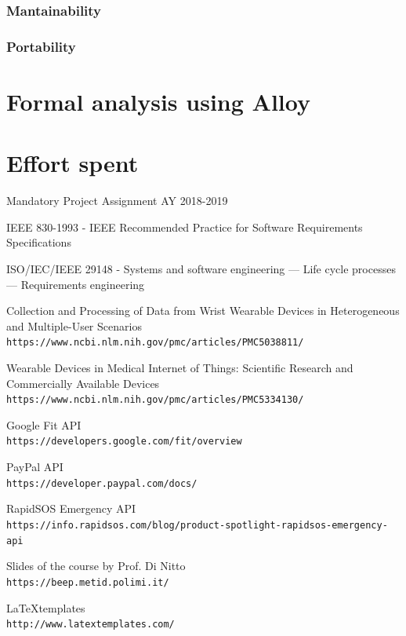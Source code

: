 \documentclass[12pt]{article}
\begin{document}
    \subsubsection{Mantainability}
    \subsubsection{Portability}

\clearpage
\section{Formal analysis using Alloy}
\label{sec:alloy}

\clearpage
\section{Effort spent}
\label{sec:effort}

\clearpage
\begin{thebibliography}{9}
   Mandatory Project Assignment AY 2018-2019

   IEEE 830-1993 - IEEE Recommended Practice for Software Requirements Specifications

   ISO/IEC/IEEE 29148 - Systems and software engineering — Life cycle processes — Requirements engineering

   Collection and Processing of Data from Wrist Wearable Devices in Heterogeneous and Multiple-User Scenarios\\
  \texttt{https://www.ncbi.nlm.nih.gov/pmc/articles/PMC5038811/}

   Wearable Devices in Medical Internet of Things: Scientific Research and Commercially Available Devices\\
  \texttt{https://www.ncbi.nlm.nih.gov/pmc/articles/PMC5334130/}

   Google Fit API\\
  \texttt{https://developers.google.com/fit/overview}

   PayPal API\\
  \texttt{https://developer.paypal.com/docs/}

   RapidSOS Emergency API\\
  \texttt{https://info.rapidsos.com/blog/product-spotlight-rapidsos-emergency-api}

  Slides of the course by Prof. Di Nitto\\
  \texttt{https://beep.metid.polimi.it/}

  \LaTeX templates\\
  \texttt{http://www.latextemplates.com/}


\end{thebibliography}
\end{document}
